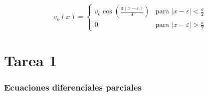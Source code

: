 \documentclass[11pt]{report}
\theoremstyle{plain}
\theoremstyle{definition}
\begin{document}
\begin{equation*}
	v_o(x)=
	\begin{cases}
		v_o\cos(\frac{\pi (x-\varepsilon)}{d}) & \text{para }|x-\varepsilon | < \frac{a}{2}\\
		0 & \text{para }|x-\varepsilon | > \frac{a}{2}
	\end{cases}
\end{equation*}

\part{Tarea 1}
\section{Ecuaciones diferenciales parciales}

\end{document}
